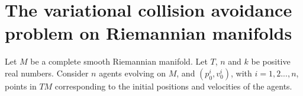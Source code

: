 \documentclass[letterpaper, 10 pt, conference]{ieeeconf}  %
\begin{document}



\section{The variational collision avoidance problem on Riemannian manifolds}

\iffalse
\textcolor{red}{Is the graph theory introduced below essential since we do not make use of it later on ?}
%
Using graph theory, we can model the communication topology among $n$ agents in the formation.  A  graph $\mathcal{G}$ consists of a pair $(\mathcal{V},\mathcal{E})$, where $V=\{1,2,...,n\}$ is a finite nonempty set of nodes describing the kinematics of each single agent and $\mathcal{E}\subset \mathcal{V}\times\mathcal{V}$ denotes the set of edges of the graph, $p:=\frac{n(n-1)}{2}$ symmetric binary relations that link two agents. An edge $e_{(i,j)}$ denotes that node $j$ can obtain information from $i$. %
\fi

\label{S:3}
Let $M$ be a complete smooth Riemannian manifold. Let $T$, $n$ and $k$ be positive real numbers. Consider $n$ agents evolving on $M$, and $(p_{0}^{i}, v_{0}^{i})$, with $i=1,2...,n$,  points in $TM$ corresponding to the initial positions and velocities of the agents. 
\end{document}

